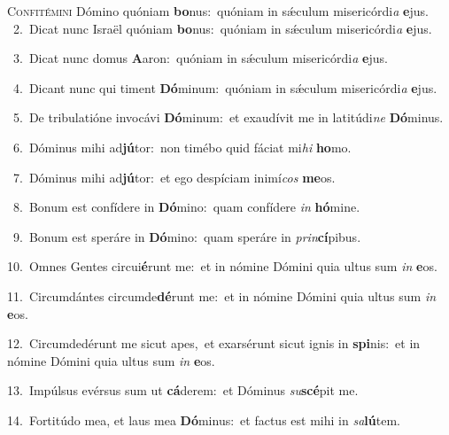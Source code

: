 \lettrine{\initial\textcolor{\initialcolor}{C}}{onfitémini} Dómino quóniam \textbf{bo}\-nus:~\star quóniam in sǽculum misericórdi\textit{a} \textbf{e}\-jus.\\
{\numbfont\textcolor{\numbcolor}{~2.}}~Dicat nunc Israël quóniam \textbf{bo}\-nus:~\star quóniam in sǽculum misericórdi\textit{a} \textbf{e}\-jus.\par
{\numbfont\textcolor{\numbcolor}{~3.}}~Dicat nunc domus \textbf{A}\-aron:~\star quóniam in sǽculum misericórdi\textit{a} \textbf{e}\-jus.\par
{\numbfont\textcolor{\numbcolor}{~4.}}~Dicant nunc qui timent \textbf{Dó}\-minum:~\star quóniam in sǽculum misericórdi\textit{a} \textbf{e}\-jus.\par
{\numbfont\textcolor{\numbcolor}{~5.}}~De tribulatióne invocávi \textbf{Dó}\-minum:~\star et exaudívit me in latitúdi\textit{ne} \textbf{Dó}\-minus.\par
{\numbfont\textcolor{\numbcolor}{~6.}}~Dóminus mihi ad\-\textbf{jú}\-tor:~\star non timébo quid fáciat mi\textit{hi} \textbf{ho}\-mo.\par
{\numbfont\textcolor{\numbcolor}{~7.}}~Dóminus mihi ad\-\textbf{jú}\-tor:~\star et ego despíciam inimí\textit{cos} \textbf{me}\-os.\par
{\numbfont\textcolor{\numbcolor}{~8.}}~Bonum est confídere in \textbf{Dó}\-mino:~\star quam confídere \textit{in} \textbf{hó}\-mine.\par
{\numbfont\textcolor{\numbcolor}{~9.}}~Bonum est speráre in \textbf{Dó}\-mino:~\star quam speráre in \textit{prin}\-\textbf{cí}pibus.\par
{\numbfont\textcolor{\numbcolor}{10.}}~Omnes Gentes circui\-\textbf{é}\-runt me:~\star et in nómine Dómini quia ultus sum \textit{in} \textbf{e}\-os.\par
{\numbfont\textcolor{\numbcolor}{11.}}~Circumdántes circumde\-\textbf{dé}\-runt me:~\star et in nómine Dómini quia ultus sum \textit{in} \textbf{e}\-os.\par
{\numbfont\textcolor{\numbcolor}{12.}}~Circumdedérunt me sicut apes,~\dagger et exarsérunt sicut ignis in \textbf{spi}\-nis:~\star et in nómine Dómini quia ultus sum \textit{in} \textbf{e}\-os.\par
{\numbfont\textcolor{\numbcolor}{13.}}~Impúlsus evérsus sum ut \textbf{cá}\-derem:~\star et Dóminus \textit{su}\-\textbf{scé}pit me.\par
{\numbfont\textcolor{\numbcolor}{14.}}~Fortitúdo mea, et laus mea \textbf{Dó}\-minus:~\star et factus est mihi in \textit{sa}\-\textbf{lú}tem.\par
